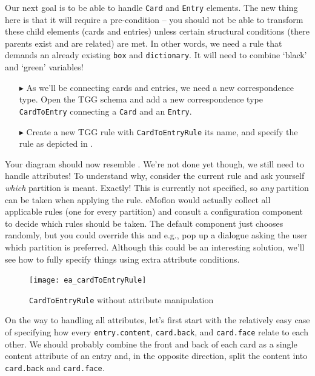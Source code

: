 Our next goal is to be able to handle \texttt{Card} and \texttt{Entry} elements. 
The new thing here is that it will require a pre-condition -- you should not be able to transform these child elements (cards and entries) unless certain structural conditions (there parents exist and are related) are met. 
In other words, we need a rule that demands an already existing \texttt{box} and \texttt{dictionary}. 
It will need to combine `black' and `green' variables! 

\begin{enumerate}

\item[$\blacktriangleright$] As we'll be connecting cards and entries, we need a new correspondence type.
Open the TGG schema and add a new correspondence type \texttt{CardToEntry} connecting a \texttt{Card} and an \texttt{Entry}.

\item[$\blacktriangleright$] Create a new TGG rule with \texttt{Card\-To\-Ent\-ry\-Rule} its name, and specify the rule as depicted in .
\end{enumerate}

Your diagram should now resemble . 
We're not done yet though, we still need to handle attributes!
To understand why, consider the current rule and ask yourself  \emph{which} partition is meant.
Exactly!  This is currently not specified, so \emph{any} partition can be taken when applying the rule.
eMoflon would actually collect all applicable rules (one for every partition) and consult a configuration component to decide which rules should be taken.
The default component just chooses randomly, but you could override this and e.g., pop up a dialogue asking the user which partition is preferred.
Although this could be an interesting solution, we'll see how to fully specify things using extra attribute conditions.

\begin{figure}[htbp]
  \begin{center}
    \texttt{[image: ea\_cardToEntryRule]}
    \caption{\texttt{CardToEntryRule} without attribute manipulation}
    \label{ea:cardtoentry_1}
  \end{center}
\end{figure}

On the way to handling all attributes, let's first start with the relatively easy case of specifying how every \texttt{entry\-.cont\-ent}, \texttt{card.back}, and \texttt{card.face} relate to each other.
We should probably combine the front and back of each card as a single content attribute of an entry and, in the opposite direction, split the content into \texttt{card.back} and \texttt{card.face}.

